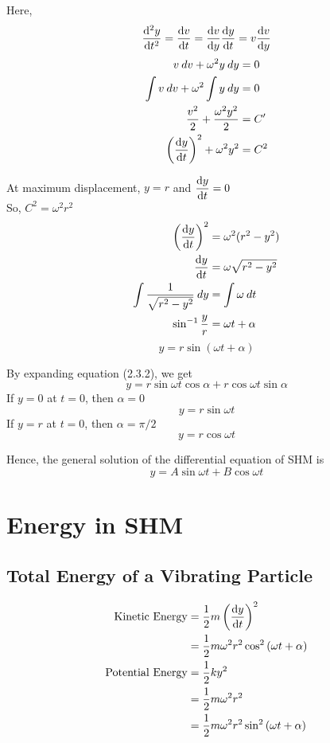 \documentclass[12pt]{article}
\numberwithin{equation}{subsection}
\begin{document}
Here, \[
    \dv[2]{y}{t} = \dv{v}{t} = \dv{v}{y} \dv{y}{t} = v \dv{v}{y}
\]
\begin{align*}
    v \: d{v} + \omega^2y \: d{y} &= 0 \\
    \int{v} \: d{v} + \omega^2 \int{y} \: d{y} &= 0 \\
    \frac{v^2}{2} + \frac{\omega^2 y^2}{2} &= C' \\
    \left( \dv{y}{t} \right) ^2 + \omega^2 y^2 &= C^2
\end{align*}

At maximum displacement, $y = r$ and $\displaystyle \dv{y}{t} = 0$ \\
So, $C^2 = \omega^2 r^2$ \\
\begin{align*}
    \left( \dv{y}{t} \right)^2 &= \omega^2(r^2 - y^2) \\
    \dv{y}{t} &= \omega \sqrt{r^2 - y^2} \\
    \int{\frac{1}{\sqrt{r^2-y^2}}} \: d{y} &= \int{\omega} \: d{t} \\
    \sin^{-1}{\frac{y}{r}} &= \omega t + \alpha
\end{align*}
\begin{equation}
    \boxed{ y = r \sin{(\omega t + \alpha)} }
\end{equation}

By expanding equation (2.3.2), we get
\begin{equation}
    y = r \sin{\omega t} \cos{\alpha} + r \cos{\omega t} \sin{\alpha}
\end{equation}
If $y = 0$ at $t = 0$, then $\alpha = 0$ \\
\begin{equation}
    y = r \sin{\omega t}
\end{equation}
If $y = r$ at $t = 0$, then $\alpha = \pi/2$ \\
\begin{equation}
    y = r \cos{\omega t}
\end{equation}

Hence, the general solution of the differential equation of SHM is
\begin{equation}
    \boxed{ y = A \sin{\omega t} + B \cos{\omega t} }
\end{equation}

\section{Energy in SHM}
\subsection{Total Energy of a Vibrating Particle}
\begin{align*}
    \text{Kinetic Energy} &= \frac{1}{2} m \left( \dv{y}{t} \right)^2 \\
    &= \frac{1}{2} m \omega^2 r^2 \cos^2{(\omega t + \alpha)} \\
    \text{Potential Energy} &= \frac{1}{2} k y^2 \\
    &= \frac{1}{2} m \omega^2 r^2 \\
    &= \frac{1}{2} m \omega^2 r^2 \sin^2{(\omega t + \alpha)}
\end{align*}
\end{document}
